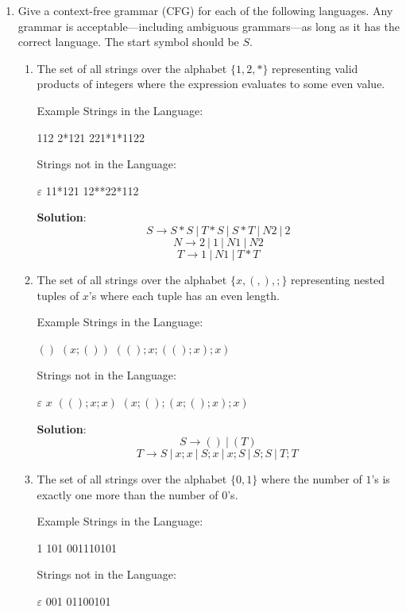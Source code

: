 \documentclass[11pt]{article}
\newcommand\tab[1][1cm]{\hspace*{#1}}
\let\epsilon\varepsilon
\begin{document}
\begin{enumerate}
\item  Give a context-free grammar (CFG) for each of the following languages. Any grammar is acceptable---including ambiguous grammars---as long as it has the correct language. The start symbol should be $S$.
  \begin{enumerate}
  \item The set of all strings over the alphabet $\{1,2,*\}$ representing valid products of integers where the expression evaluates to some even value.

    Example Strings in the Language:
    \begin{center}
      112 \tab \tab 2*121 \tab \tab 221*1*1122
    \end{center}
    Strings not in the Language:
    \begin{center}
      $\epsilon$ \tab \tab 11*121  \tab \tab 12**22*112
    \end{center}
    
    \textbf{Solution}:
    $$S\to S*S\ |\ T*S\ |\ S*T\ |\ N2\ |\ 2$$
    $$N\to 2\ |\ 1\ |\ N1\ |\ N2$$
    $$T\to 1\ |\ N1\ |\ T*T$$
    
  \item The set of all strings over the alphabet $\{x,(,),;\}$ representing nested tuples of $x$'s where each tuple has an even length.

    Example Strings in the Language:
    \begin{center}
      $()$ \tab \tab $(x;())$ \tab \tab $((); x; ((); x); x)$
    \end{center}
    Strings not in the Language:
    \begin{center}
      $\epsilon$ \tab \tab $x$ \tab \tab $((); x; x)$  \tab \tab $(x; (); (x; (); x); x)$
    \end{center}
    
    \textbf{Solution}:
    $$S\to ()\ |\ (T)$$
    $$T\to S\ |\ x;x\ |\ S;x\ |\ x;S\ |\ S;S\ |\ T;T\ $$
    
  \item  The set of all strings over the alphabet $\{0, 1\}$ where the number of $1$'s is exactly one more than the number of $0$'s.

    Example Strings in the Language:
    \begin{center}
      1 \tab \tab 101  \tab \tab 001110101
    \end{center}
    Strings not in the Language: 
    \begin{center}
      $\epsilon$ \tab \tab 001 \tab \tab 01100101
    \end{center}
    

\end{enumerate}
\end{enumerate}
\end{document}
